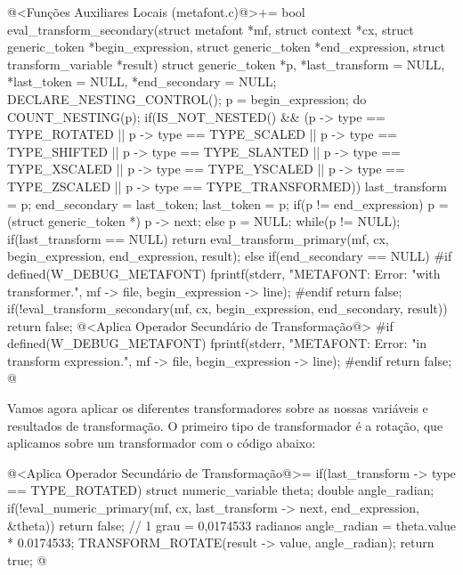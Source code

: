 \iniciocodigo
@<Funções Auxiliares Locais (metafont.c)@>+=
bool eval_transform_secondary(struct metafont *mf, struct context *cx,
                              struct generic_token *begin_expression,
                              struct generic_token *end_expression,
                              struct transform_variable *result){
  struct generic_token *p, *last_transform = NULL, *last_token = NULL,
                       *end_secondary = NULL;
  DECLARE_NESTING_CONTROL();
  p = begin_expression;
  do{
    COUNT_NESTING(p);
    if(IS_NOT_NESTED() &&
       (p -> type == TYPE_ROTATED || p -> type == TYPE_SCALED ||
        p -> type == TYPE_SHIFTED || p -> type == TYPE_SLANTED ||
        p -> type == TYPE_XSCALED || p -> type == TYPE_YSCALED ||
        p -> type == TYPE_ZSCALED || p -> type == TYPE_TRANSFORMED)){
      last_transform = p;
      end_secondary = last_token;
    }
    last_token = p;
    if(p != end_expression)
      p = (struct generic_token *) p -> next;
    else
      p = NULL;
  } while(p != NULL);
  if(last_transform == NULL)
    return eval_transform_primary(mf, cx, begin_expression, end_expression,
                                  result);
  else{
    if(end_secondary == NULL){
#if defined(W_DEBUG_METAFONT)
      fprintf(stderr, "METAFONT: Error: %
              "with transformer.",  mf -> file, begin_expression -> line);
#endif
      return false;
    }
    if(!eval_transform_secondary(mf, cx, begin_expression, end_secondary,
                                 result))
      return false;
    @<Aplica Operador Secundário de Transformação@>
#if defined(W_DEBUG_METAFONT)
    fprintf(stderr, "METAFONT: Error: %
            "in transform expression.",  mf -> file, begin_expression -> line);
#endif
    return false;
  }
}
@
\fimcodigo

Vamos agora aplicar os diferentes transformadores sobre as nossas
variáveis e resultados de transformação. O primeiro tipo de
transformador é a rotação, que aplicamos sobre um transformador com o
código abaixo:


\iniciocodigo
@<Aplica Operador Secundário de Transformação@>=
if(last_transform -> type == TYPE_ROTATED){
  struct numeric_variable theta;
  double angle_radian;
  if(!eval_numeric_primary(mf, cx, last_transform -> next, end_expression,
                           &theta))
    return false;
  // 1 grau = 0,0174533 radianos
  angle_radian = theta.value * 0.0174533;
  TRANSFORM_ROTATE(result -> value, angle_radian);
  return true;
}
@
\fimcodigo


